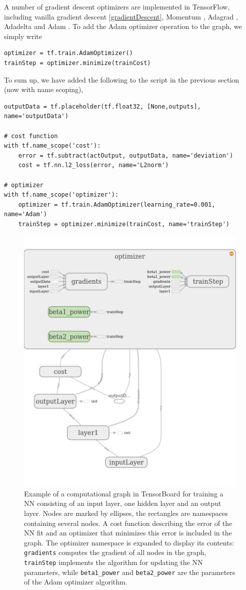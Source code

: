 \documentclass[twoside,english]{uiofysmaster}
\begin{document}
A number of gradient descent optimizers are implemented in TensorFlow, including
vanilla gradient descent \eqref{gradientDescent}, Momentum \cite{Qian99}, Adagrad \cite{Duchi11}, 
Adadelta \cite{Zeiler12} and Adam \cite{Kingma14}.
To add the Adam optimizer operation to the graph, we simply write
\begin{verbatim}
optimizer = tf.train.AdamOptimizer()
trainStep = optimizer.minimize(trainCost)
\end{verbatim}
To sum up, we have added the following to the script in the previous section (now with name scoping),
\begin{verbatim}
outputData = tf.placeholder(tf.float32, [None,outputs], name='outputData')

# cost function
with tf.name_scope('cost'):
    error = tf.subtract(actOutput, outputData, name='deviation')
    cost = tf.nn.l2_loss(error, name='L2norm')

# optimizer
with tf.name_scope('optimizer'):
    optimizer = tf.train.AdamOptimizer(learning_rate=0.001, name='Adam')
    trainStep = optimizer.minimize(trainCost, name='trainStep')
\end{verbatim}
\begin{figure}[b]
\centering
  \includegraphics[width=0.8\linewidth]{Figures/Implementation/tensorBoardTraining.pdf}
  \caption{Example of a computational graph in TensorBoard for training a NN consisting of an input layer, one 
	   hidden layer and an output layer. Nodes are marked by ellipses, the rectangles are namespaces
	   containing several nodes. A cost function describing the error of the NN fit and an optimizer that minimizes
	   this error is included in the graph. The optimizer namespace is expanded to display its contents:
	   \texttt{gradients} computes the gradient of all nodes in the graph, \texttt{trainStep} implements
	   the algorithm for updating the NN parameters, while \texttt{beta1\_power} and \texttt{beta2\_power}
	   are the parameters of the Adam optimizer algorithm.}
  \label{fig:tensorBoardTraining}
\end{figure}
\end{document}
